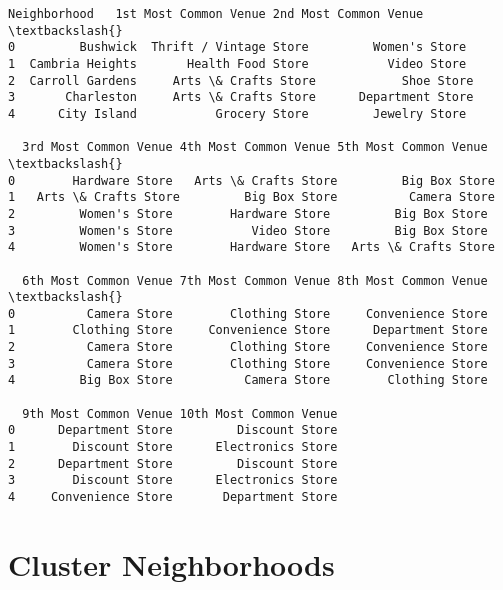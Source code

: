 \documentclass[11pt]{article}
\makeatletter
\newcommand{\boxspacing}{\kern\kvtcb@left@rule\kern\kvtcb@boxsep}
\newcommand{\prompt}[4]{
        \ttfamily\llap{{\color{#2}[#3]:\hspace{3pt}#4}}\vspace{-\baselineskip}
    }
\makeatother
\begin{document}
            \begin{tcolorbox}[breakable, size=fbox, boxrule=.5pt, pad at break*=1mm, opacityfill=0]
\prompt{Out}{outcolor}{33}{\boxspacing}
\begin{Verbatim}[commandchars=\\\{\}]
      Neighborhood   1st Most Common Venue 2nd Most Common Venue  \textbackslash{}
0         Bushwick  Thrift / Vintage Store         Women's Store
1  Cambria Heights       Health Food Store           Video Store
2  Carroll Gardens     Arts \& Crafts Store            Shoe Store
3       Charleston     Arts \& Crafts Store      Department Store
4      City Island           Grocery Store         Jewelry Store

  3rd Most Common Venue 4th Most Common Venue 5th Most Common Venue  \textbackslash{}
0        Hardware Store   Arts \& Crafts Store         Big Box Store
1   Arts \& Crafts Store         Big Box Store          Camera Store
2         Women's Store        Hardware Store         Big Box Store
3         Women's Store           Video Store         Big Box Store
4         Women's Store        Hardware Store   Arts \& Crafts Store

  6th Most Common Venue 7th Most Common Venue 8th Most Common Venue  \textbackslash{}
0          Camera Store        Clothing Store     Convenience Store
1        Clothing Store     Convenience Store      Department Store
2          Camera Store        Clothing Store     Convenience Store
3          Camera Store        Clothing Store     Convenience Store
4         Big Box Store          Camera Store        Clothing Store

  9th Most Common Venue 10th Most Common Venue
0      Department Store         Discount Store
1        Discount Store      Electronics Store
2      Department Store         Discount Store
3        Discount Store      Electronics Store
4     Convenience Store       Department Store
\end{Verbatim}
\end{tcolorbox}
        
    \hypertarget{cluster-neighborhoods}{%
\section{Cluster Neighborhoods}\label{cluster-neighborhoods}}
\end{document}
